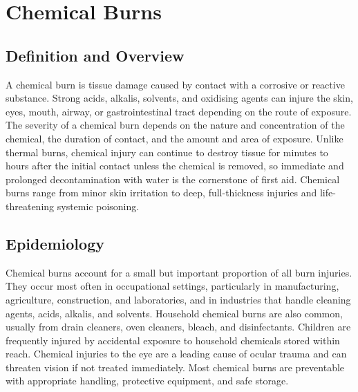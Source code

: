 \chapter{Chemical Burns}

\section*{Definition and Overview}
A chemical burn is tissue damage caused by contact with a corrosive or reactive substance. Strong acids, alkalis, solvents, and oxidising agents can injure the skin, eyes, mouth, airway, or gastrointestinal tract depending on the route of exposure. The severity of a chemical burn depends on the nature and concentration of the chemical, the duration of contact, and the amount and area of exposure. Unlike thermal burns, chemical injury can continue to destroy tissue for minutes to hours after the initial contact unless the chemical is removed, so immediate and prolonged decontamination with water is the cornerstone of first aid. Chemical burns range from minor skin irritation to deep, full-thickness injuries and life-threatening systemic poisoning.

\section*{Epidemiology}
Chemical burns account for a small but important proportion of all burn injuries. They occur most often in occupational settings, particularly in manufacturing, agriculture, construction, and laboratories, and in industries that handle cleaning agents, acids, alkalis, and solvents. Household chemical burns are also common, usually from drain cleaners, oven cleaners, bleach, and disinfectants. Children are frequently injured by accidental exposure to household chemicals stored within reach. Chemical injuries to the eye are a leading cause of ocular trauma and can threaten vision if not treated immediately. Most chemical burns are preventable with appropriate handling, protective equipment, and safe storage.

